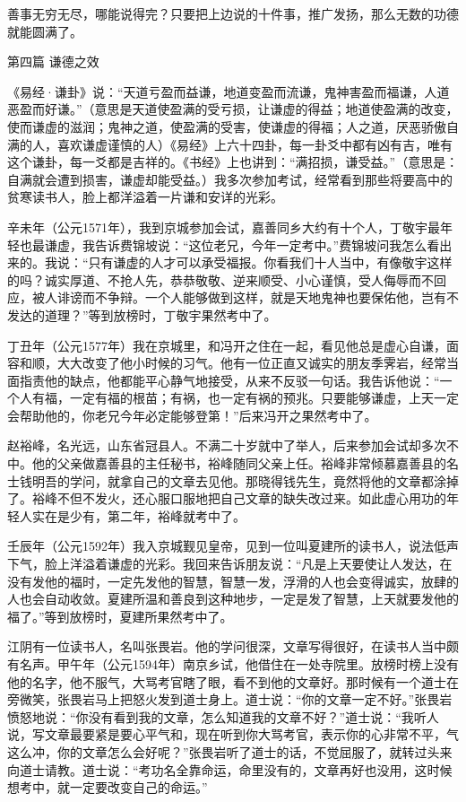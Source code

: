 \documentclass[12pt,UTF8]{ctexbook}
\begin{document}
善事无穷无尽，哪能说得完？只要把上边说的十件事，推广发扬，那么无数的功德就能圆满了。


第四篇 谦德之效

《易经·谦卦》说：“天道亏盈而益谦，地道变盈而流谦，鬼神害盈而福谦，人道恶盈而好谦。”（意思是天道使盈满的受亏损，让谦虚的得益；地道使盈满的改变，使而谦虚的滋润；鬼神之道，使盈满的受害，使谦虚的得福；人之道，厌恶骄傲自满的人，喜欢谦虚谨慎的人）《易经》上六十四卦，每一卦爻中都有凶有吉，唯有这个谦卦，每一爻都是吉祥的。《书经》上也讲到：“满招损，谦受益。”（意思是：自满就会遭到损害，谦虚却能受益。）我多次参加考试，经常看到那些将要高中的贫寒读书人，脸上都洋溢着一片谦和安详的光彩。

辛未年（公元1571年），我到京城参加会试，嘉善同乡大约有十个人，丁敬宇最年轻也最谦虚，我告诉费锦坡说：“这位老兄，今年一定考中。”费锦坡问我怎么看出来的。我说：“只有谦虚的人才可以承受福报。你看我们十人当中，有像敬宇这样的吗？诚实厚道、不抢人先，恭恭敬敬、逆来顺受、小心谨慎，受人侮辱而不回应，被人诽谤而不争辩。一个人能够做到这样，就是天地鬼神也要保佑他，岂有不发达的道理？”等到放榜时，丁敬宇果然考中了。

丁丑年（公元1577年）我在京城里，和冯开之住在一起，看见他总是虚心自谦，面容和顺，大大改变了他小时候的习气。他有一位正直又诚实的朋友季霁岩，经常当面指责他的缺点，他都能平心静气地接受，从来不反驳一句话。我告诉他说：“一个人有福，一定有福的根苗；有祸，也一定有祸的预兆。只要能够谦虚，上天一定会帮助他的，你老兄今年必定能够登第！”后来冯开之果然考中了。

赵裕峰，名光远，山东省冠县人。不满二十岁就中了举人，后来参加会试却多次不中。他的父亲做嘉善县的主任秘书，裕峰随同父亲上任。裕峰非常倾慕嘉善县的名士钱明吾的学问，就拿自己的文章去见他。那晓得钱先生，竟然将他的文章都涂掉了。裕峰不但不发火，还心服口服地把自己文章的缺失改过来。如此虚心用功的年轻人实在是少有，第二年，裕峰就考中了。

壬辰年（公元1592年）我入京城觐见皇帝，见到一位叫夏建所的读书人，说法低声下气，脸上洋溢着谦虚的光彩。我回来告诉朋友说：“凡是上天要使让人发达，在没有发他的福时，一定先发他的智慧，智慧一发，浮滑的人也会变得诚实，放肆的人也会自动收敛。夏建所温和善良到这种地步，一定是发了智慧，上天就要发他的福了。”等到放榜时，夏建所果然考中了。

江阴有一位读书人，名叫张畏岩。他的学问很深，文章写得很好，在读书人当中颇有名声。甲午年（公元1594年）南京乡试，他借住在一处寺院里。放榜时榜上没有他的名字，他不服气，大骂考官瞎了眼，看不到他的文章好。那时候有一个道士在旁微笑，张畏岩马上把怒火发到道士身上。道士说：“你的文章一定不好。”张畏岩愤怒地说：“你没有看到我的文章，怎么知道我的文章不好？”道士说：“我听人说，写文章最要紧是要心平气和，现在听到你大骂考官，表示你的心非常不平，气这么冲，你的文章怎么会好呢？”张畏岩听了道士的话，不觉屈服了，就转过头来向道士请教。道士说：“考功名全靠命运，命里没有的，文章再好也没用，这时候想考中，就一定要改变自己的命运。”
\end{document}
